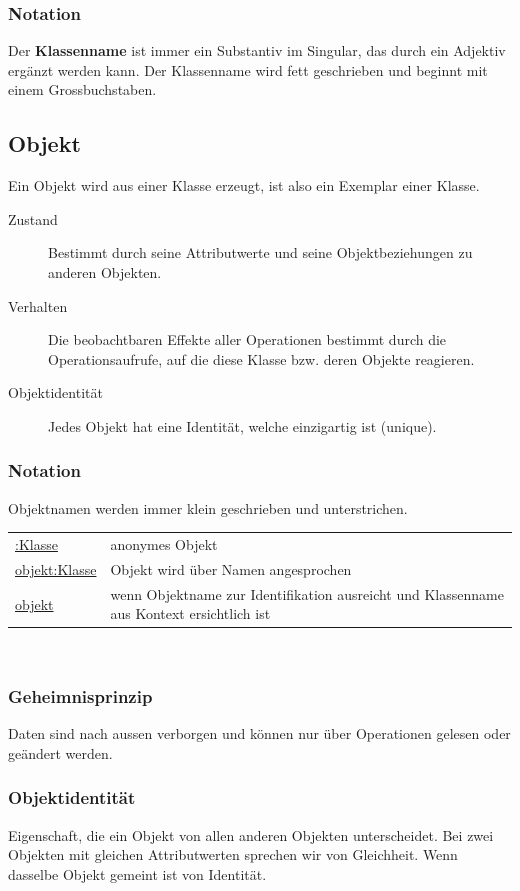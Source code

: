   \subsubsection{Notation}
  		Der \textbf{Klassenname} ist immer ein Substantiv im Singular, das durch ein Adjektiv
  		ergänzt werden kann. Der Klassenname wird fett geschrieben und beginnt mit einem
  		Grossbuchstaben. \\
  
\subsection{Objekt }
	Ein Objekt wird aus einer Klasse erzeugt, ist also ein Exemplar einer Klasse.
	\begin{description}
		\item[Zustand] 
      Bestimmt durch seine Attributwerte und seine Objektbeziehungen zu anderen Objekten.
		\item[Verhalten] 
      Die beobachtbaren Effekte aller Operationen bestimmt durch die Operationsaufrufe, 
      auf die diese Klasse bzw. deren Objekte reagieren.
		\item[Objektidentität] 
      Jedes Objekt hat eine Identität, welche einzigartig ist (unique).
	\end{description}
	
	\subsubsection{Notation}
			Objektnamen werden immer klein geschrieben und unterstrichen. \\
		\begin{tabular}{l l}
			\underline{:Klasse} & anonymes Objekt \\
			\underline{objekt:Klasse} & Objekt wird über Namen angesprochen \\
			\underline{objekt} & wenn Objektname zur Identifikation ausreicht und Klassenname aus Kontext ersichtlich ist \\
		\end{tabular}\\
		
	\begin{multicols}{2}	
		\subsubsection{Geheimnisprinzip}
		Daten sind nach aussen verborgen und können nur über Operationen gelesen oder geändert werden.\\
		\vfill\null
		\columnbreak
		\subsubsection{Objektidentität}
		Eigenschaft, die ein Objekt von allen anderen Objekten unterscheidet. Bei zwei Objekten
		mit gleichen Attributwerten sprechen wir von Gleichheit. Wenn dasselbe Objekt gemeint ist von Identität.
	\end{multicols}
	

